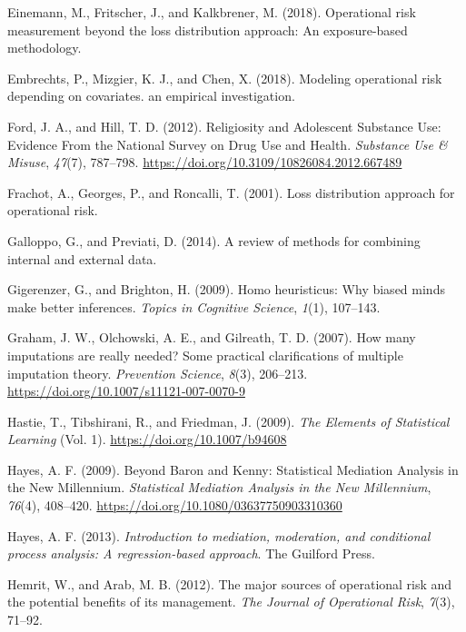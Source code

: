 \documentclass[]{DissertateUSU}
\begin{document}
\hypertarget{ref-einemann2018operational}{}
Einemann, M., Fritscher, J., and Kalkbrener, M. (2018). Operational risk
measurement beyond the loss distribution approach: An exposure-based
methodology.

\hypertarget{ref-embrechts2018modeling}{}
Embrechts, P., Mizgier, K. J., and Chen, X. (2018). Modeling operational
risk depending on covariates. an empirical investigation.

\hypertarget{ref-Ford2012}{}
Ford, J. A., and Hill, T. D. (2012). Religiosity and Adolescent
Substance Use: Evidence From the National Survey on Drug Use and Health.
\emph{Substance Use \& Misuse}, \emph{47}(7), 787--798.
\url{https://doi.org/10.3109/10826084.2012.667489}

\hypertarget{ref-frachot2001loss}{}
Frachot, A., Georges, P., and Roncalli, T. (2001). Loss distribution
approach for operational risk.

\hypertarget{ref-galloppo2014review}{}
Galloppo, G., and Previati, D. (2014). A review of methods for combining
internal and external data.

\hypertarget{ref-gigerenzer2009homo}{}
Gigerenzer, G., and Brighton, H. (2009). Homo heuristicus: Why biased
minds make better inferences. \emph{Topics in Cognitive Science},
\emph{1}(1), 107--143.

\hypertarget{ref-Graham2007}{}
Graham, J. W., Olchowski, A. E., and Gilreath, T. D. (2007). How many
imputations are really needed? Some practical clarifications of multiple
imputation theory. \emph{Prevention Science}, \emph{8}(3), 206--213.
\url{https://doi.org/10.1007/s11121-007-0070-9}

\hypertarget{ref-Hastie2009}{}
Hastie, T., Tibshirani, R., and Friedman, J. (2009). \emph{The Elements
of Statistical Learning} (Vol. 1). \url{https://doi.org/10.1007/b94608}

\hypertarget{ref-Hayes2009}{}
Hayes, A. F. (2009). Beyond Baron and Kenny: Statistical Mediation
Analysis in the New Millennium. \emph{Statistical Mediation Analysis in
the New Millennium}, \emph{76}(4), 408--420.
\url{https://doi.org/10.1080/03637750903310360}

\hypertarget{ref-Hayes2013book}{}
Hayes, A. F. (2013). \emph{Introduction to mediation, moderation, and
conditional process analysis: A regression-based approach}. The Guilford
Press.

\hypertarget{ref-hemrit2012major}{}
Hemrit, W., and Arab, M. B. (2012). The major sources of operational
risk and the potential benefits of its management. \emph{The Journal of
Operational Risk}, \emph{7}(3), 71--92.
\end{document}
